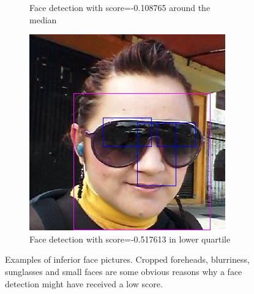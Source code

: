 \begin{figure}
\begin{subfigure}[t]{0.3\textwidth}
      \caption{Face detection with score=-0.108765 around the median}
      \label{fig:spec:fd:median_detected1}
    \end{subfigure}
    \begin{subfigure}[t]{0.3\textwidth}
      \includegraphics[width=\textwidth]{figures/spec/detected_q1_f1c5f486-1697-4089-9bb6-7962d7db630c}
      \caption{Face detection with score=-0.517613 in lower quartile}
      \label{fig:spec:fd:q1_detected3}
    \end{subfigure}
\caption{Examples of inferior face pictures. Cropped foreheads, blurriness, sunglasses and small faces are some obvious reasons why a face detection might have received a low score.}
\label{fig:spec:fd:other_detected}
\end{figure}

